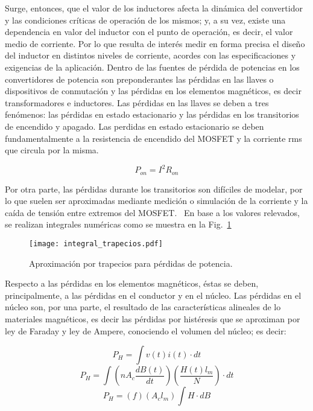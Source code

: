 Surge, entonces, que el valor de los inductores afecta la dinámica del convertidor y las condiciones críticas de operación de los mismos; y, a su vez, existe una dependencia en valor del inductor con el punto de operación, es decir, el valor medio de corriente. Por lo que resulta de interés medir en forma precisa el diseño del inductor en distintos niveles de corriente, acordes con las especificaciones y exigencias de la aplicación.
Dentro de las fuentes de pérdida de potencias en los convertidores de potencia son preponderantes las pérdidas en las llaves o dispositivos de conmutación y las pérdidas en los elementos magnéticos, es decir transformadores e inductores. Las pérdidas en las llaves se deben a tres fenómenos: las pérdidas en estado estacionario y las pérdidas en los transitorios de encendido y apagado. Las perdidas en estado estacionario se deben fundamentalmente a la resistencia de encendido del MOSFET y la corriente rms que circula por la misma.

\begin{equation}\label{eq:perdidasFET}
P_{on} = I^{2}R_{on} 
\end{equation}

Por otra parte, las pérdidas durante los transitorios son difíciles de modelar, por lo que suelen ser aproximadas mediante medición o simulación de la corriente y la caída de tensión entre extremos del MOSFET.~\cite{cita:Deng2004} En base a los valores relevados, se realizan integrales numéricas como se muestra en la Fig.~\ref{fig:integral_trapecios}

\begin{figure}[H]
\centering
\texttt{[image: integral\_trapecios.pdf]}
\caption{Aproximación por trapecios para pérdidas de potencia.~\cite{cita:Deng2004}}
\label{fig:integral_trapecios}
\end{figure}

Respecto a las pérdidas en los elementos magnéticos, éstas se deben, principalmente, a las pérdidas en el conductor y en el núcleo. Las pérdidas en el núcleo son, por una parte, el resultado de las características alineales de lo materiales magnéticos, es decir las pérdidas por histéresis que se aproximan por ley de Faraday y ley de Ampere, conociendo el volumen del núcleo; es decir:

\begin{equation}\label{eq:perdidasHisteresis1}
P_{H} =  \int v(t)i(t) \cdot dt
\end{equation}
\begin{equation}\label{eq:perdidasHisteresis2}
P_{H} =  \int (nA_c\frac{dB(t)}{dt})(\frac{H(t)l_m}{N}) \cdot dt
\end{equation}
\begin{equation}\label{eq:perdidasHisteresis3}
P_{H} =   (f)(A_c l_m)\int H \cdot dB
\end{equation}

